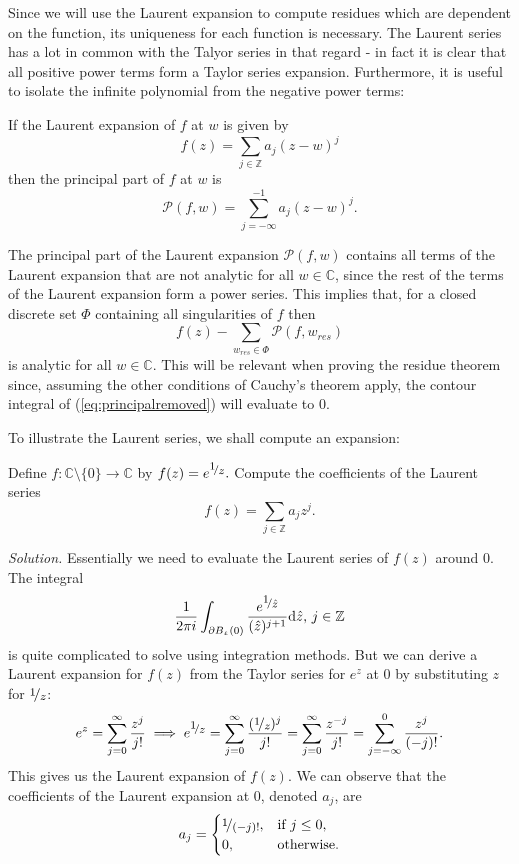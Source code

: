 \documentclass[a4paper]{article}
\def\nicefrac#1#2{%
    \raise.5ex\hbox{\begin{footnotesize}$#1$\end{footnotesize}}%
    \kern-.15em/\kern-.035em%
    \lower.25ex\hbox{\begin{footnotesize}$#2$\end{footnotesize}}}
\begin{document}
Since we will use the Laurent expansion to compute residues which are dependent on the function, its uniqueness for each function is necessary. The Laurent series has a lot in common with the Talyor series in that regard - in fact it is clear that all positive power terms form a Taylor series expansion. Furthermore, it is useful to isolate the infinite polynomial from the negative power terms:
\begin{definition}{\citep[p.75]{Princeton}}{}
If the Laurent expansion of $f$ at $w$ is given by
\[f(z) = \sum_{j \in \mathbb{Z}} a_{j}(z-w)^{j}\]
then the principal part of $f$ at $w$ is
\[\mathcal{P}(f,w) = \sum_{j=-\infty}^{-1} a_{j}(z-w)^{j}.\]
\end{definition}

The principal part of the Laurent expansion $\mathcal{P}(f,w)$ contains all terms of the Laurent expansion that are not analytic for all $w \in \mathbb{C}$, since the rest of the terms of the Laurent expansion form a power series. This implies that, for a closed discrete set $\Phi$ containing all singularities of $f$ then
\begin{equation}\label{eq:principalremoved}
f(z) - \sum_{w_{res}\in\Phi}\mathcal{P}(f,w_{res})
\end{equation}
is analytic for all $w \in \mathbb{C}$. This will be relevant when proving the residue theorem since, assuming the other conditions of Cauchy's theorem apply, the contour integral of (\ref{eq:principalremoved}) will evaluate to $0$.

To illustrate the Laurent series, we shall compute an expansion:

\begin{example}{}{}\label{thm:explaurentexpansion}
Define $f: \mathbb{C}\setminus\{0\} \rightarrow \mathbb{C}$ by $f(z)=e^{\nicefrac{1}{z}}.$ Compute the coefficients of the Laurent series 
\[f(z) = \sum_{j \in \mathbb{Z}} a_{j}z^{j}.\]
\end{example} 

\noindent\textit{Solution.}
Essentially we need to evaluate the Laurent series of $f(z)$ around $0$. The integral
\[\frac{1}{2\pi i }\int_{\partial B_{\upvarepsilon}(0)} { \frac{e^{\nicefrac{1}{\hat{z}}}}{(\hat{z})^{j+1}} \dd \hat{z}}\text{, }  j \in \mathbb{Z}\]
is quite complicated to solve using integration methods. But we can derive a Laurent expansion for $f(z)$ from the Taylor series for $e^{z}$ at $0$ by substituting $z$ for $\nicefrac{1}{z}$:
\[e^{z} = \sum_{j=0}^{\infty} \frac{z^{j}}{j!} \implies e^{\nicefrac{1}{z}} = \sum_{j=0}^{\infty} \frac{(\nicefrac{1}{z})^{j}}{j!} = \sum_{j=0}^{\infty} \frac{{z}^{-j}}{j!} = \sum_{j=-\infty}^{0} \frac{{z}^{j}}{(-j)!}.\]
This gives us the Laurent expansion of $f(z)$. We can observe that the coefficients of the Laurent expansion at 0, denoted $a_{j}$, are 
\begin{equation} \label{eq:coefficientslaurent}
a_{j}=\begin{cases} \nicefrac{1}{(-j)!}, & \text{if } j\leq 0 , \\ 0, & \text{otherwise.} \end{cases} 
\end{equation}
\end{document}
